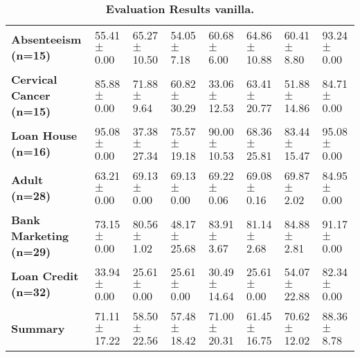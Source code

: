 \begin{table}[htb]
{\begin{tabular}{llllllll}
\textbf{Absenteeism (n=15)                       } &  \phantom{0}55.41 $\pm$ \phantom{0}0.00 &            \phantom{0}65.27 $\pm$ 10.50 &  \phantom{0}54.05 $\pm$ \phantom{0}7.18 &  \phantom{0}60.68 $\pm$ \phantom{0}6.00 &            \phantom{0}64.86 $\pm$ 10.88 &  \phantom{0}60.41 $\pm$ \phantom{0}8.80 &  \phantom{0}93.24 $\pm$ \phantom{0}0.00 \\
\textbf{Cervical Cancer (n=15)                   } &  \phantom{0}85.88 $\pm$ \phantom{0}0.00 &  \phantom{0}71.88 $\pm$ \phantom{0}9.64 &            \phantom{0}60.82 $\pm$ 30.29 &            \phantom{0}33.06 $\pm$ 12.53 &            \phantom{0}63.41 $\pm$ 20.77 &            \phantom{0}51.88 $\pm$ 14.86 &  \phantom{0}84.71 $\pm$ \phantom{0}0.00 \\
\textbf{Loan House (n=16)                        } &  \phantom{0}95.08 $\pm$ \phantom{0}0.00 &            \phantom{0}37.38 $\pm$ 27.34 &            \phantom{0}75.57 $\pm$ 19.18 &            \phantom{0}90.00 $\pm$ 10.53 &            \phantom{0}68.36 $\pm$ 25.81 &            \phantom{0}83.44 $\pm$ 15.47 &  \phantom{0}95.08 $\pm$ \phantom{0}0.00 \\
\textbf{Adult (n=28)                             } &  \phantom{0}63.21 $\pm$ \phantom{0}0.00 &  \phantom{0}69.13 $\pm$ \phantom{0}0.00 &  \phantom{0}69.13 $\pm$ \phantom{0}0.00 &  \phantom{0}69.22 $\pm$ \phantom{0}0.06 &  \phantom{0}69.08 $\pm$ \phantom{0}0.16 &  \phantom{0}69.87 $\pm$ \phantom{0}2.02 &  \phantom{0}84.95 $\pm$ \phantom{0}0.00 \\
\textbf{Bank Marketing (n=29)                    } &  \phantom{0}73.15 $\pm$ \phantom{0}0.00 &  \phantom{0}80.56 $\pm$ \phantom{0}1.02 &            \phantom{0}48.17 $\pm$ 25.68 &  \phantom{0}83.91 $\pm$ \phantom{0}3.67 &  \phantom{0}81.14 $\pm$ \phantom{0}2.68 &  \phantom{0}84.88 $\pm$ \phantom{0}2.81 &  \phantom{0}91.17 $\pm$ \phantom{0}0.00 \\
\textbf{Loan Credit (n=32)                       } &  \phantom{0}33.94 $\pm$ \phantom{0}0.00 &  \phantom{0}25.61 $\pm$ \phantom{0}0.00 &  \phantom{0}25.61 $\pm$ \phantom{0}0.00 &            \phantom{0}30.49 $\pm$ 14.64 &  \phantom{0}25.61 $\pm$ \phantom{0}0.00 &            \phantom{0}54.07 $\pm$ 22.88 &  \phantom{0}82.34 $\pm$ \phantom{0}0.00 \\
\midrule
\textbf{Summary                                  } &            \phantom{0}71.11 $\pm$ 17.22 &            \phantom{0}58.50 $\pm$ 22.56 &            \phantom{0}57.48 $\pm$ 18.42 &            \phantom{0}71.00 $\pm$ 20.31 &            \phantom{0}61.45 $\pm$ 16.75 &            \phantom{0}70.62 $\pm$ 12.02 &  \phantom{0}88.36 $\pm$ \phantom{0}8.78 \\
\bottomrule
\end{tabular}%
}
\caption{\textbf{Evaluation Results vanilla.}}
\label{tab:eval-results}
\end{table}
